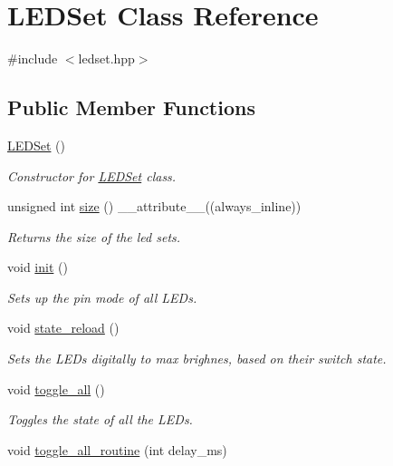 \hypertarget{classLEDSet}{}\section{L\+E\+D\+Set Class Reference}
\label{classLEDSet}


{\ttfamily \#include $<$ledset.\+hpp$>$}

\subsection*{Public Member Functions}
\begin{DoxyCompactItemize}
\item 
\hyperlink{classLEDSet_a4a65c9b26a11c2e62e65170d1088e201}{L\+E\+D\+Set} ()
\begin{DoxyCompactList}\small\item\em Constructor for \hyperlink{classLEDSet}{L\+E\+D\+Set} class. \end{DoxyCompactList}\item 
unsigned int \hyperlink{classLEDSet_ad7a588c0ad5a73ef70cb465b39f83e0b}{size} () \+\_\+\+\_\+attribute\+\_\+\+\_\+((always\+\_\+inline))
\begin{DoxyCompactList}\small\item\em Returns the size of the led sets. \end{DoxyCompactList}\item 
void \hyperlink{classLEDSet_a907747547c2967c4db9597247c0acd9c}{init} ()
\begin{DoxyCompactList}\small\item\em Sets up the pin mode of all L\+E\+Ds. \end{DoxyCompactList}\item 
void \hyperlink{classLEDSet_a52d7a48f6639ce1df579e960e5a78890}{state\+\_\+reload} ()
\begin{DoxyCompactList}\small\item\em Sets the L\+E\+Ds digitally to max brighnes, based on their switch state. \end{DoxyCompactList}\item 
void \hyperlink{classLEDSet_a555f8e48ff0989647cba6de505db8a5d}{toggle\+\_\+all} ()
\begin{DoxyCompactList}\small\item\em Toggles the state of all the L\+E\+Ds. \end{DoxyCompactList}\item 
void \hyperlink{classLEDSet_a5ba8bc8d99267bcaa579fea860ebe7d0}{toggle\+\_\+all\+\_\+routine} (int delay\+\_\+ms)

\end{DoxyCompactItemize}
